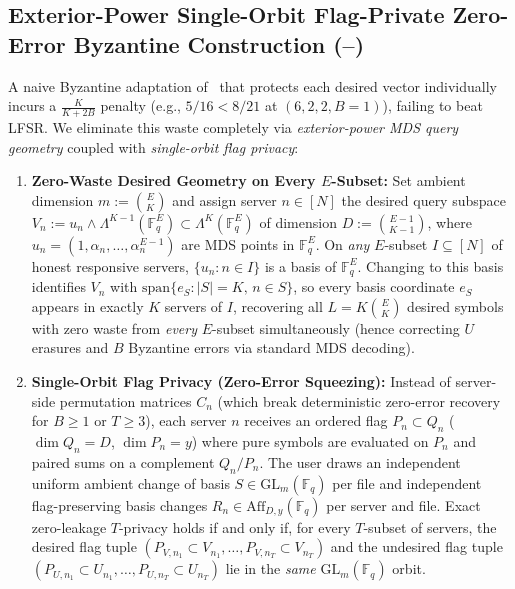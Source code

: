 \documentclass[11pt,letterpaper]{amsart}
\DeclareRobustCommand{\texttt}[1]{\ifmmode\text{\upshape\ttfamily #1}\else{\upshape\ttfamily #1}\fi}
\theoremstyle{plain}
\theoremstyle{definition}
\newcommand{\F}{\mathbb{F}}
\newcommand{\spn}{\mathrm{span}}
\newcommand{\aff}{\mathrm{Aff}}
\begin{document}
\subsection{Exterior-Power Single-Orbit Flag-Private Zero-Error Byzantine Construction (\texttt{T1c}--\texttt{T1d})}
A naive Byzantine adaptation of~\cite{SunTaoXuZhang2026} that protects each desired vector individually incurs a $\frac{K}{K+2B}$ penalty (e.g., $5/16 < 8/21$ at $(6,2,2,B=1)$), failing to beat LFSR. We eliminate this waste completely via \emph{exterior-power MDS query geometry} coupled with \emph{single-orbit flag privacy}:

\begin{enumerate}[leftmargin=1.8em]
  \item \textbf{Zero-Waste Desired Geometry on Every $E$-Subset:} Set ambient dimension $m := \binom{E}{K}$ and assign server $n \in [N]$ the desired query subspace $V_n := u_n \wedge \Lambda^{K-1}(\F_q^E) \subset \Lambda^K(\F_q^E)$ of dimension $D := \binom{E-1}{K-1}$, where $u_n = (1, \alpha_n, \dots, \alpha_n^{E-1})$ are MDS points in $\F_q^E$. On \emph{any} $E$-subset $I \subseteq [N]$ of honest responsive servers, $\{u_n : n \in I\}$ is a basis of $\F_q^E$. Changing to this basis identifies $V_n$ with $\spn\{e_S : |S|=K,\, n \in S\}$, so every basis coordinate $e_S$ appears in exactly $K$ servers of $I$, recovering all $L = K\binom{E}{K}$ desired symbols with zero waste from \emph{every} $E$-subset simultaneously (hence correcting $U$ erasures and $B$ Byzantine errors via standard MDS decoding).
  \item \textbf{Single-Orbit Flag Privacy (Zero-Error Squeezing):} Instead of server-side permutation matrices $C_n$ (which break deterministic zero-error recovery for $B \ge 1$ or $T \ge 3$), each server $n$ receives an ordered flag $P_n \subset Q_n$ ($\dim Q_n = D$, $\dim P_n = y$) where pure symbols are evaluated on $P_n$ and paired sums on a complement $Q_n / P_n$. The user draws an independent uniform ambient change of basis $S \in \mathrm{GL}_m(\F_q)$ per file and independent flag-preserving basis changes $R_n \in \aff_{D,y}(\F_q)$ per server and file. Exact zero-leakage $T$-privacy holds if and only if, for every $T$-subset of servers, the desired flag tuple $(P_{V,n_1} \subset V_{n_1}, \dots, P_{V,n_T} \subset V_{n_T})$ and the undesired flag tuple $(P_{U,n_1} \subset U_{n_1}, \dots, P_{U,n_T} \subset U_{n_T})$ lie in the \emph{same} $\mathrm{GL}_m(\F_q)$ orbit.
\end{enumerate}
\end{document}
